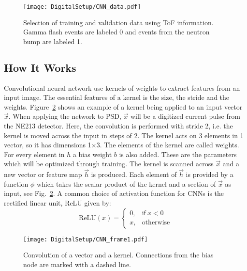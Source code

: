 \documentclass[main.tex]{subfiles}
\begin{document}
\begin{figure}[h!]
    \centering
        \texttt{[image: DigitalSetup/CNN\_data.pdf]}
        \caption[Selection of training and validation data]{Selection of training and validation data using ToF information. Gamma flash events are labeled 0 and events from the neutron bump are labeled 1.}
    \label{fig:CNN_data} 
\end{figure}

\subsection{How It Works}
Convolutional neural network use kernels of weights to extract features from an input image. The essential features of a kernel is the size, the stride and the weights. Figure~\ref{fig:CNN_frame1} shows an example of a kernel being applied to an input vector $\vec{x}$. When applying the network to PSD, $\vec{x}$ will be a digitized current pulse from the NE213 detector. Here, the convolution is performed with stride 2, i.e. the kernel is moved across the input in steps of 2. The kernel acts on 3 elements in 1 vector, so it has dimensions 1$\times$3. The elements of the kernel are called weights. For every element in $h$ a bias weight $b$ is also added. These are the parameters which will be optimized through training. The kernel is scanned across $\vec{x}$ and a new vector or feature map $\vec{h}$ is produced. Each element of $\vec{h}$ is provided by a function $\phi$ which takes the scalar product of the kernel and a section of $\vec{x}$ as input, see Fig.~\ref{fig:CNN_frame1}. A common choice of activation function for CNNs is the rectified linear unit, ReLU given by:
\begin{equation}
	\textrm{ReLU}(x) = 
	\begin{cases}
    	0, & \text{if}\ x<0 \\
    	x, & \text{otherwise}
    \end{cases}
\end{equation}


\begin{figure}[h!]
    \centering
        \texttt{[image: DigitalSetup/CNN\_frame1.pdf]}
        \caption[Convolution of a vector and a kernel]{Convolution of a vector and a kernel. Connections from the bias node are marked with a dashed line.}
    \label{fig:CNN_frame1} 
\end{figure}
\end{document}
